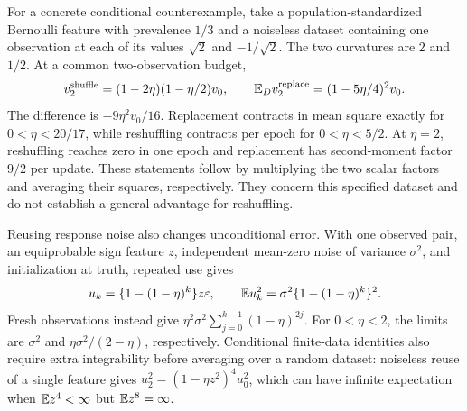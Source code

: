 For a concrete conditional counterexample, take a population-standardized
Bernoulli feature with prevalence $1/3$ and a noiseless dataset containing one
observation at each of its values $\sqrt2$ and $-1/\sqrt2$. The two curvatures
are $2$ and $1/2$. At a common two-observation budget,
\[
 v_2^{\mathrm{shuffle}} = (1 - 2\eta)(1 - \eta/2)v_0,\qquad \mathbb{E}_Dv_2^{\mathrm{replace}}
                        = (1 - 5\eta/4)^2v_0.
\]
The difference is $-9\eta^2v_0/16$. Replacement contracts in mean square exactly
for $0 < \eta < 20/17$, while reshuffling contracts per epoch for
$0 < \eta < 5/2$. At $\eta = 2$, reshuffling reaches zero in one epoch and
replacement has second-moment factor $9/2$ per update. These statements follow
by multiplying the two scalar factors and averaging their squares, respectively.
They concern this specified dataset and do not establish a general advantage for
reshuffling.

Reusing response noise also changes unconditional error. With one observed pair,
an equiprobable sign feature $z$, independent mean-zero noise of variance
$\sigma^2$, and initialization at truth, repeated use gives
\[
 u_k = \{1 - (1 - \eta)^k\}z\varepsilon,\qquad \mathbb{E} u_k^2
     = \sigma^2\{1 - (1 - \eta)^k\}^2.
\]
Fresh observations instead give $\eta^2\sigma^2\sum_{j=0}^{k-1}(1 - \eta)^{2j}$.
For $0 < \eta < 2$, the limits are $\sigma^2$ and $\eta\sigma^2/(2 - \eta)$,
respectively. Conditional finite-data identities also require extra
integrability before averaging over a random dataset: noiseless reuse of a
single feature gives $u_2^2 = (1 - \eta z^2)^4u_0^2$, which can have infinite
expectation when $\mathbb{E} z^4 < \infty$ but $\mathbb{E} z^8 = \infty$.
